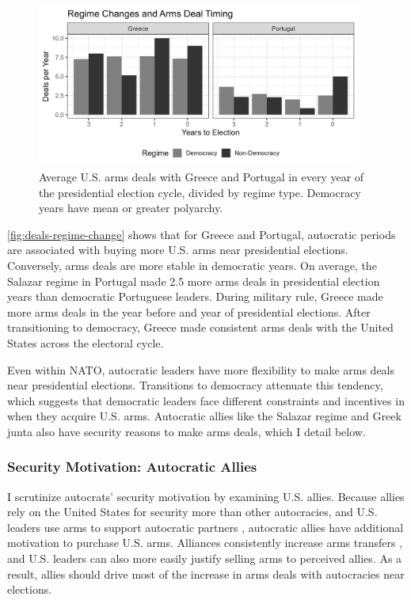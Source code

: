 \documentclass[12pt]{article}
\begin{document}
\begin{figure}[htpb]
	\centering
		\includegraphics[width=0.95\textwidth]{../figures/deals-regime-change.png}
	\caption{Average U.S. arms deals with Greece and Portugal in every year of the presidential election cycle, divided by regime type. Democracy years have mean or greater polyarchy.}
	\label{fig:deals-regime-change}
\end{figure}


\autoref{fig:deals-regime-change} shows that for Greece and Portugal, autocratic periods are associated with buying more U.S. arms near presidential elections.
Conversely, arms deals are more stable in democratic years. 
On average, the Salazar regime in Portugal made 2.5 more arms deals in presidential election years than democratic Portuguese leaders.
During military rule, Greece made more arms deals in the year before and year of presidential elections.
After transitioning to democracy, Greece made consistent arms deals with the United States across the electoral cycle.


Even within NATO, autocratic leaders have more flexibility to make arms deals near presidential elections. 
Transitions to democracy attenuate this tendency, which suggests that democratic leaders face different constraints and incentives in when they acquire U.S. arms. 
Autocratic allies like the Salazar regime and Greek junta also have security reasons to make arms deals, which I detail below. 



\subsubsection{Security Motivation: Autocratic Allies}


I scrutinize autocrats' security motivation by examining U.S. allies. 
Because allies rely on the United States for security more than other autocracies, and U.S. leaders use arms to support autocratic partners \citep{Yarhi-Miloetal2016}, autocratic allies have additional motivation to purchase U.S. arms. 
Alliances consistently increase arms transfers \citep{Thurneretal2019}, and U.S. leaders can also more easily justify selling arms to perceived allies. 
As a result, allies should drive most of the increase in arms deals with autocracies near elections. 
\end{document}
